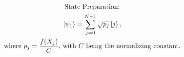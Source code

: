 \documentclass[border=0pt,varwidth]{standalone}
\begin{document}
\vspace*{1em}
\begin{gather*}
\text{State Preparation:} \\
\ket{\psi_1}=\sum^{N-1}_{j=0}\sqrt{p_j}\ket{j}, \\
\text{where } p_j=\frac{f(X_j)}{C} \text{, with } C \text{ being the normalizing constant.} \\
\end{gather*}
\vspace*{1em}
\end{document}
